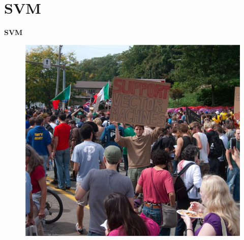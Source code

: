 \section{SVM}

\begin{frame}
	
  \centerline{\textbf{\Huge{SVM}}}
           
	\begin{figure}[ht]
	\centering
	\includegraphics[width=0.5\linewidth]{partition/img/svm_0.png}  
	\end{figure}

\end{frame} 

